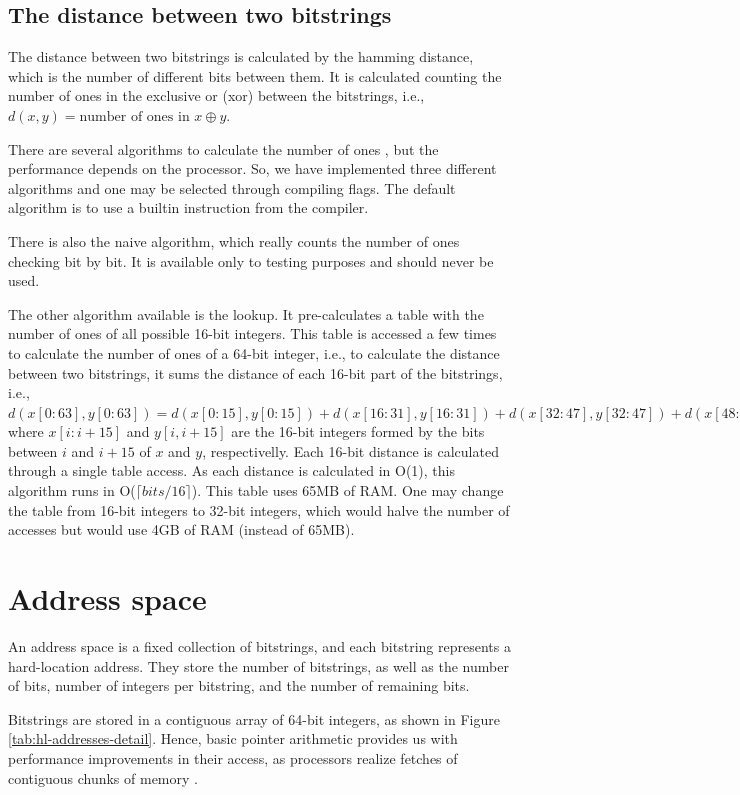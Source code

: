 \subsection{The distance between two bitstrings}

The distance between two bitstrings is calculated by the hamming distance, which is the number of different bits between them. It is calculated counting the number of ones in the exclusive or (xor) between the bitstrings, i.e., $d(x, y) = \text{number of ones in } x \oplus y$.

There are several algorithms to calculate the number of ones \citep{warren2013hacker}, but the performance depends on the processor. So, we have implemented three different algorithms and one may be selected through compiling flags. The default algorithm is to use a builtin instruction from the compiler.

There is also the naive algorithm, which really counts the number of ones checking bit by bit. It is available only to testing purposes and should never be used.

The other algorithm available is the lookup. It pre-calculates a table with the number of ones of all possible 16-bit integers. This table is accessed a few times to calculate the number of ones of a 64-bit integer, i.e., to calculate the distance between two bitstrings, it sums the distance of each 16-bit part of the bitstrings, i.e., $d(x[0:63], y[0:63]) = d(x[0:15], y[0:15]) + d(x[16:31], y[16:31]) + d(x[32:47], y[32:47]) + d(x[48:63], y[48:63])$ where $x[i:i+15]$ and $y[i, i+15]$ are the 16-bit integers formed by the bits between $i$ and $i+15$ of $x$ and $y$, respectivelly. Each 16-bit distance is calculated through a single table access. As each distance is calculated in O(1), this algorithm runs in O($\lceil bits/16 \rceil$). This table uses 65MB of RAM. One may change the table from 16-bit integers to 32-bit integers, which would halve the number of accesses but would use 4GB of RAM (instead of 65MB).


\section{Address space}

An address space is a fixed collection of bitstrings, and each bitstring represents a hard-location address. They store the number of bitstrings, as well as the number of bits, number of integers per bitstring, and the number of remaining bits.

Bitstrings are stored in a contiguous array of 64-bit integers, as shown in Figure \ref{tab:hl-addresses-detail}. Hence, basic pointer arithmetic provides us with performance improvements in their access, as processors realize fetches of contiguous chunks of memory  \citep{pai2004linux}.

